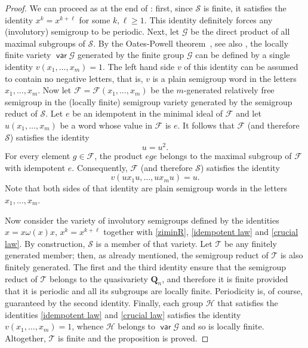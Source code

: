 \documentclass[11pt,reqno]{amsart}
\DeclareMathOperator{\var}{\mathsf{var}}
\numberwithin{equation}{section}
\theoremstyle{remark}
\def\om{\omega}
\begin{document}
\begin{proof}
We can proceed as at the end of \cite{margolissapir}: first, since
$\mathcal{S}$ is finite, it satisfies the identity
$x^k=x^{k+\ell}$ for some $k,\ell\ge 1$. This identity definitely
forces any (involutory) semigroup to be periodic. Next, let
$\mathcal{G}$ be the direct product of all maximal subgroups of
$\mathcal{S}$. By the Oates-Powell theorem~\cite{oatespowell}, see
also \cite[\S5.2]{Ne}, the locally finite variety
$\var\mathcal{G}$ generated by the finite group $\mathcal{G}$ can
be defined by a single identity $v(x_1,\dots,x_m)=1$. The left
hand side $v$ of this identity can be assumed to contain no
negative letters, that is, $v$ is a plain semigroup word in the
letters $x_1,\dots,x_m$. Now let
$\mathcal{F}=\mathcal{F}(x_1,\dots,x_m)$ be the $m$-generated
relatively free semigroup in the (locally finite) semigroup
variety generated by the semigroup reduct of $\mathcal{S}$. Let
$e$ be an idempotent in the minimal ideal of $\mathcal{F}$ and let
$u(x_1,\dots,x_m)$ be a word  whose value in $\mathcal{F}$ is $e$.
It follows that $\mathcal{F}$ (and therefore $\mathcal{S}$)
satisfies the identity
\begin{equation}
\label{idempotent law} u=u^2.
\end{equation}
For every element $g\in\mathcal{F}$, the product $ege$ belongs to
the maximal subgroup of $\mathcal{F}$ with idempotent $e$.
Consequently, $\mathcal{F}$ (and therefore $\mathcal{S}$)
satisfies the identity
\begin{equation}
\label{crucial law} v(ux_1u,\dots,ux_mu)=u.
\end{equation}
Note that both sides of that identity are plain semigroup words in
the letters $x_1,\dots,x_m$.

Now consider the variety of involutory semigroups defined by the
identities $x=x\om(x)x$, $x^k=x^{k+\ell}$ together with
\eqref{ziminR}, \eqref{idempotent law} and \eqref{crucial law}. By
construction, $\mathcal{S}$ is a member of that variety. Let
$\mathcal{T}$ be any finitely generated member; then, as already
mentioned, the semigroup reduct of $\mathcal{T}$ is also finitely
generated. The first and the third identity ensure that the
semigroup reduct of $\mathcal{T}$ belongs to the quasivariety
$\mathbf{Q}_n$, and therefore it is finite provided that it is
periodic and all its subgroups are locally finite. Periodicity is,
of course, guaranteed by the second identity. Finally, each group
$\mathcal{H}$ that satisfies the identities \eqref{idempotent law}
and \eqref{crucial law} satisfies the identity
$v(x_1,\dots,x_m)=1$, whence $\mathcal{H}$ belongs to
$\var\mathcal{G}$ and so is locally finite. Altogether,
$\mathcal{T}$ is finite and the proposition is proved.
\end{proof}
\end{document}

